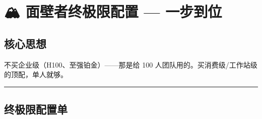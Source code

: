 \documentclass[
  12pt,
]{ctexart}
\author{SCX}
\date{2026}
\begin{document}
\section{🏔️ 面壁者终极限配置 ---
一步到位}\label{ux9762ux58c1ux8005ux7ec8ux6781ux9650ux914dux7f6e-ux4e00ux6b65ux5230ux4f4d}

\subsection{核心思想}\label{ux6838ux5fc3ux601dux60f3}

不买企业级（H100、至强铂金）------那是给 100
人团队用的。买消费级/工作站级的顶配，单人就够。

\begin{center}\rule{0.5\linewidth}{0.5pt}\end{center}

\subsection{终极限配置单}\label{ux7ec8ux6781ux9650ux914dux7f6eux5355}
\end{document}
